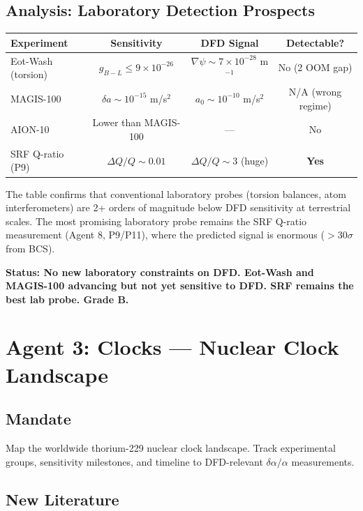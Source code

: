 \documentclass[11pt,a4paper]{article}
\begin{document}
\subsection{Analysis: Laboratory Detection Prospects}

\begin{center}
\begin{tabular}{lccc}
\toprule
\textbf{Experiment} & \textbf{Sensitivity} & \textbf{DFD Signal} & \textbf{Detectable?} \\
\midrule
Eot-Wash (torsion) & $g_{B-L} \leq 9 \times 10^{-26}$ & $\nabla\psi \sim 7 \times 10^{-28}$ m$^{-1}$ & No (2 OOM gap) \\
MAGIS-100 & $\delta a \sim 10^{-15}$ m/s$^2$ & $a_0 \sim 10^{-10}$ m/s$^2$ & N/A (wrong regime) \\
AION-10 & Lower than MAGIS-100 & --- & No \\
SRF Q-ratio (P9) & $\Delta Q/Q \sim 0.01$ & $\Delta Q/Q \sim 3$ (huge) & \textbf{Yes} \\
\bottomrule
\end{tabular}
\end{center}

The table confirms that conventional laboratory probes (torsion balances, atom interferometers) are 2+ orders of magnitude below DFD sensitivity at terrestrial scales. The most promising laboratory probe remains the SRF Q-ratio measurement (Agent 8, P9/P11), where the predicted signal is enormous ($>30\sigma$ from BCS).

\textbf{Status: No new laboratory constraints on DFD. Eot-Wash and MAGIS-100 advancing but not yet sensitive to DFD. SRF remains the best lab probe. Grade B.}

\section{Agent 3: Clocks --- Nuclear Clock Landscape}

\subsection{Mandate}
Map the worldwide thorium-229 nuclear clock landscape. Track experimental groups, sensitivity milestones, and timeline to DFD-relevant $\delta\alpha/\alpha$ measurements.

\subsection{New Literature}
\end{document}
